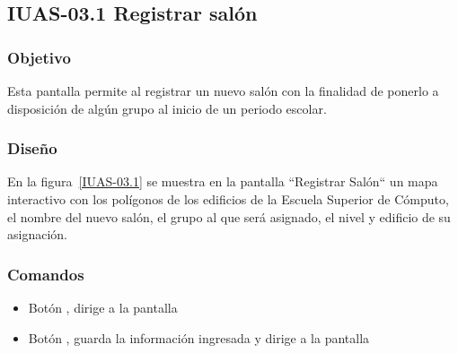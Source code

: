\subsection{IUAS-03.1 Registrar salón}

\subsubsection{Objetivo}

	
    Esta pantalla permite al  registrar un nuevo salón con la finalidad de ponerlo a disposición de algún grupo al inicio de un periodo escolar.
\subsubsection{Diseño}


    En la figura~\ref{IUAS-03.1} se muestra en la pantalla ``Registrar Salón“ un mapa interactivo con los polígonos de los edificios de la Escuela Superior de Cómputo, el nombre del nuevo salón, el grupo al que será asignado, el nivel y edificio de su asignación.
    



\subsubsection{Comandos}
    \begin{itemize}

	\item Botón , dirige a la pantalla 
	\item Botón , guarda la información ingresada y dirige a la pantalla 
    \end{itemize}
